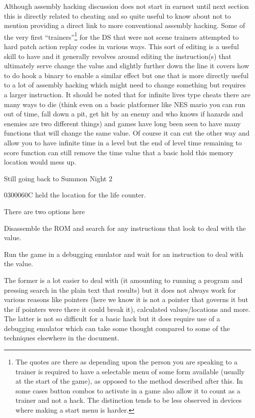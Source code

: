 \documentclass[
]{book}
\begin{document}
Although assembly hacking discussion does not start in earnest until next section this is directly related to cheating and so quite useful to know about not to mention providing a direct link to more conventional assembly hacking. Some of the very first ``trainers''\footnote{The quotes are there as depending upon the person you are speaking to a trainer is required to have a selectable menu of some form available (usually at the start of the game), as opposed to the method described after this. In some cases button combos to activate in a game also allow it to count as a trainer and not a hack. The distinction tends to be less observed in devices where making a start menu is harder.} for the DS that were not scene trainers attempted to hard patch action replay codes in various ways. This sort of editing is a useful skill to have and it generally revolves around editing the instruction(s) that ultimately serve change the value and slightly further down the line it covers how to do hook a binary to enable a similar effect but one that is more directly useful to a lot of assembly hacking which might need to change something but requires a larger instruction. It should be noted that for infinite lives type cheats there are many ways to die (think even on a basic platformer like NES mario you can run out of time, fall down a pit, get hit by an enemy and who knows if hazards and enemies are two different things) and games have long been seen to have many functions that will change the same value. Of course it can cut the other way and allow you to have infinite time in a level but the end of level time remaining to score function can still remove the time value that a basic hold this memory location would mess up.

Still going back to Summon Night 2

0300060C held the location for the life counter.

There are two options here

Disassemble the ROM and search for any instructions that look to deal with the value.

Run the game in a debugging emulator and wait for an instruction to deal with the value.

The former is a lot easier to deal with (it amounting to running a program and pressing search in the plain text that results) but it does not always work for various reasons like pointers (here we know it is not a pointer that governs it but the if pointers were there it could break it), calculated values/locations and more. The latter is not so difficult for a basic hack but it does require use of a debugging emulator which can take some thought compared to some of the techniques elsewhere in the document.
\end{document}
